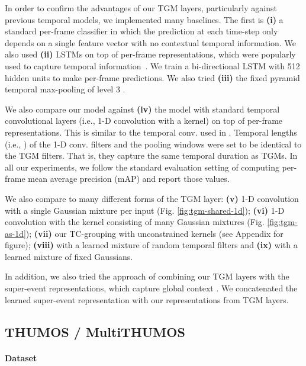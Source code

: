 \documentclass{article}
\begin{document}
In order to confirm the advantages of our TGM layers, particularly against previous temporal models, we implemented many baselines. The first is \textbf{(i)} a standard per-frame classifier in which the prediction at each time-step only depends on a single feature vector with no contextual temporal information. We also used \textbf{(ii)} LSTMs on top of per-frame representations, which were popularly used to capture temporal information~\citep{donahue2015long}. We train a bi-directional LSTM with 512 hidden units to make per-frame predictions. We also tried \textbf{(iii)} the fixed pyramid temporal max-pooling of level 3 \citep{ryoo2015pooled}.


We also compare our model against \textbf{(iv)} the model with standard temporal convolutional layers (i.e., 1-D convolution with a  kernel) on top of per-frame representations. This is similar to the temporal conv. used in \citep{tran18closer}. Temporal lengths (i.e., ) of the 1-D conv. filters and the pooling windows were set to be identical to the TGM filters. That is, they capture the same temporal duration as TGMs. In all our experiments, we follow the standard evaluation setting of computing per-frame mean average precision (mAP) and report those values. 

We also compare to many different forms of the TGM layer: \textbf{(v)} 1-D convolution with a single Gaussian mixture per input (Fig. \ref{fig:tgm-shared-1d}); \textbf{(vi)} 1-D convolution with the kernel consisting of many Gaussian mixtures (Fig. \ref{fig:tgm-as-1d}); \textbf{(vii)} our TC-grouping with unconstrained kernels (see Appendix for figure); \textbf{(viii)} with a learned mixture of random temporal filters and \textbf{(ix)} with a learned mixture of fixed Gaussians.

In addition, we also tried the approach of combining our TGM layers with the super-event representations, which capture global context \citep{piergiovanni2018super}. We concatenated the learned super-event representation with our representations from TGM layers.



\subsection{THUMOS / MultiTHUMOS}

\paragraph{Dataset}
\end{document}
